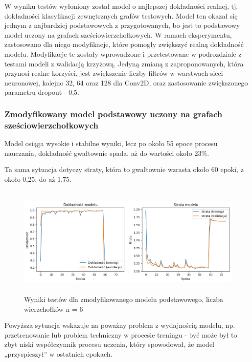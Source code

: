W wyniku testów wyłoniony został model o najlepszej dokładności realnej, tj.
dokładności klasyfikacji zewnętrznych grafów testowych.
Model ten okazał się jednym z najbardziej podstawowych z przygotowanych,
bo jest to podstawowy model uczony na grafach sześciowierzchołkowych.
W ramach eksperymentu, zastosowano dla niego modyfikacje,
które pomogły zwiększyć realną dokładność modelu.
Modyfikacje te zostały wprowadzone i przetestowane w podrozdziale z testami modeli
z walidacją krzyżową.
Jedyną zmianą z zaproponowanych, która przynosi realne korzyści,
jest zwiększenie liczby filtrów w warstwach sieci neuronowej, kolejno 32, 64 oraz 128 dla Conv2D,
oraz zastosowanie zwiększonego parametru dropout - 0,5.

\subsubsection{Zmodyfikowany model podstawowy uczony na grafach sześciowierzchołkowych}

Model osiąga wysokie i stabilne wyniki, lecz po około 55 epoce procesu nauczania,
dokładność gwałtownie spada, aż do wartości około 23\%.

Ta sama sytuacja dotyczy straty, która to gwałtownie wzrasta około 60 epoki,
z około 0,25, do aż 1,75.

\begin{figure}[ht]
	\centering
	\includegraphics[height=5.5cm]{resources/tests/images/v4/base6_1_img.png}
	\caption{Wyniki testów dla zmodyfikowanego modelu podstawowego, liczba wierzchołków n = 6}
	\label{Fig:tests-best-0a}
\end{figure}
\FloatBarrier

Powyższa sytuacja wskazuje na poważny problem z wydajnością modelu,
np. przetrenowanie lub problem techniczny w procesie treningu
- być może był to zbyt niski współczynnik procesu uczenia,
który spowodował, że model „przyspieszył” w ostatnich epokach.


